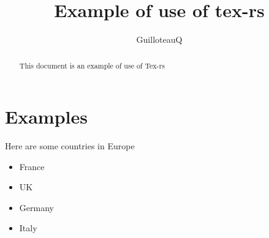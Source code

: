 \documentclass[a4paper,11pt]{article}
\title{Example of use of tex-rs}
\author{GuilloteauQ}
\begin{document}
\maketitle
\begin{abstract}
This document is an example of use of Tex-rs
\end{abstract}
\section{Examples}
Here are some countries in Europe\begin{itemize}
\item France
\item UK
\item Germany
\item Italy

\end{itemize}
\end{document}
